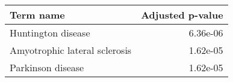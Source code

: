 \begin{tabular}{lr}
\toprule
                    Term name &  Adjusted p-value \\
\midrule
           Huntington disease &          6.36e-06 \\
Amyotrophic lateral sclerosis &          1.62e-05 \\
            Parkinson disease &          1.62e-05 \\
\bottomrule
\end{tabular}

